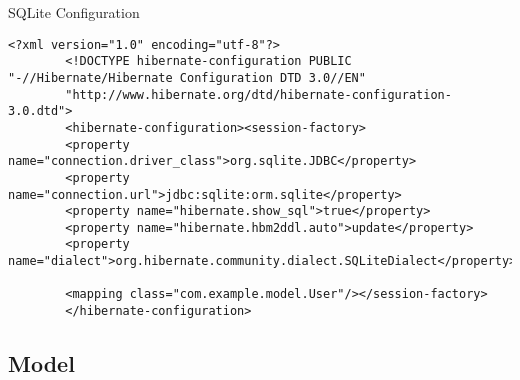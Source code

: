 \documentclass[aspectratio=169, table]{beamer}
\begin{document}
\begin{frame}[fragile]{SQLite Configuration}
	\vspace{20pt}
	\begin{lstlisting}[style=XmlStyle]
		<?xml version="1.0" encoding="utf-8"?>
		<!DOCTYPE hibernate-configuration PUBLIC "-//Hibernate/Hibernate Configuration DTD 3.0//EN"
		"http://www.hibernate.org/dtd/hibernate-configuration-3.0.dtd">
		<hibernate-configuration><session-factory>
		<property name="connection.driver_class">org.sqlite.JDBC</property>
		<property name="connection.url">jdbc:sqlite:orm.sqlite</property>
		<property name="hibernate.show_sql">true</property>
		<property name="hibernate.hbm2ddl.auto">update</property>
		<property name="dialect">org.hibernate.community.dialect.SQLiteDialect</property>
		
		<mapping class="com.example.model.User"/></session-factory>
		</hibernate-configuration>
	\end{lstlisting}
\end{frame}

\subsection{Model}
\end{document}
